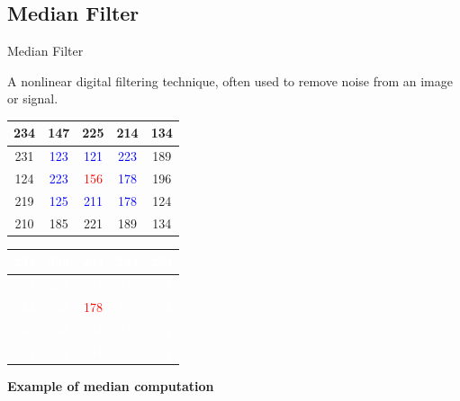 \documentclass{beamer}
\begin{document}
\subsection{Median Filter}
\begin{frame}{Median Filter}

A nonlinear digital filtering technique, often used to remove noise from an image or signal.




\begin{center}
		\begin{tabular}{|c|c|c|c|c|}
		\hline 
		234 & 147 & 225 & 214 & 134 \\ 
		\hline 
		231 & \textcolor{blue}{123} & \textcolor{blue}{121} & \textcolor{blue}{223} & 189 \\ 
		\hline 
		124 & \textcolor{blue}{223} & \textcolor{red}{156} & \textcolor{blue}{178} & 196 \\ 
		\hline 
		219 & \textcolor{blue}{125} & \textcolor{blue}{211} & \textcolor{blue}{178} & 124 \\ 
		\hline 
		210 & 185 & 221 & 189 & 134 \\ 
		\hline 
		\end{tabular}
	\end{center}

	\begin{center}
		\begin{tabular}{|c|c|c|c|c|}
		\hline 
		\textcolor{white}{234} & \textcolor{white}{234} & \textcolor{white}{234} & \textcolor{white}{234} & \textcolor{white}{234} \\ 
		\hline 
		\textcolor{white}{234} & \textcolor{white}{234} & \textcolor{white}{234} & \textcolor{white}{234} & \textcolor{white}{234} \\ 
		\hline 
		\textcolor{white}{234} & \textcolor{white}{223} & \textcolor{red}{178} & \textcolor{white}{178} & \textcolor{white}{234} \\ 
		\hline 
		\textcolor{white}{234} & \textcolor{white}{234} & \textcolor{white}{234} & \textcolor{white}{234} & \textcolor{white}{234} \\ 
		\hline 
		\textcolor{white}{234} & \textcolor{white}{234} & \textcolor{white}{234} & \textcolor{white}{234} & \textcolor{white}{234} \\ 
		\hline 
		\end{tabular}
\vspace{0.5cm}

\textbf{Example of median computation}
	\end{center}

\end{frame}
\end{document}
